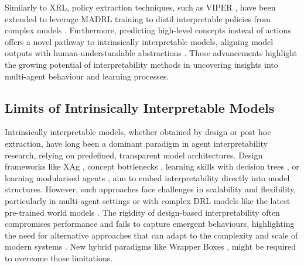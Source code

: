 Similarly to XRL, policy extraction techniques, such as VIPER \cite{Bastani2018VerifiableRL}, have been extended to leverage MADRL training to distil interpretable policies from complex models \cite{Milani2022MAVIPERLD}. Furthermore, predicting high-level concepts instead of actions offers a novel pathway to intrinsically interpretable models, aligning model outputs with human-understandable abstractions \cite{Zabounidis2023ConceptLF}. These advancements highlight the growing potential of interpretability methods in uncovering insights into multi-agent behaviour and learning processes.

\subsection{Limits of Intrinsically Interpretable Models}

Intrinsically interpretable models, whether obtained by design or post hoc extraction, have long been a dominant paradigm in agent interpretability research, relying on predefined, transparent model architectures. Design frameworks like XAg \cite{rodriguez2024explainable}, concept bottlenecks \cite{Poeta2023ConceptbasedEA}, learning skills with decision trees \cite{Wen2024SkillTreeES}, or learning modularised agents \cite{Cloud2024GradientRM}, aim to embed interpretability directly into model structures. However, such approaches face challenges in scalability and flexibility, particularly in multi-agent settings or with complex DRL models like the latest pre-trained world models \cite{Reed2022AGA,Yang2023FoundationMF, alonso2024diffusionworldmodelingvisual, Bruce2024GenieGI}. The rigidity of design-based interpretability often compromises performance and fails to capture emergent behaviours, highlighting the need for alternative approaches that can adapt to the complexity and scale of modern systems \cite{Madsen2024InterpretabilityNA}. New hybrid paradigms like Wrapper Boxes \cite{Su2023InterpretableBD}, might be required to overcome those limitations.
